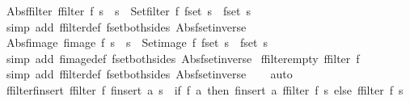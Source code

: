 \begin{isabellebody}
\endisatagproof
{\isafoldproof}%
%
\isadelimproof
\isanewline
%
\endisadelimproof
\isanewline
{}\isamarkupfalse%
\ Abs{\isacharunderscore}ffilter{\isacharcolon}\ {\isachardoublequoteopen}{\isacharparenleft}ffilter\ f\ s\ {\isacharequal}\ s{\isacharprime}{\isacharparenright}\ {\isacharequal}\ {\isacharparenleft}Set{\isachardot}filter\ f\ {\isacharparenleft}fset\ s{\isacharparenright}\ {\isacharequal}\ {\isacharparenleft}fset\ s{\isacharprime}{\isacharparenright}{\isacharparenright}{\isachardoublequoteclose}\isanewline
%
\isadelimproof
\ \ %
\endisadelimproof
%
\isatagproof
{}\isamarkupfalse%
\ {\isacharparenleft}simp\ add{\isacharcolon}\ ffilter{\isacharunderscore}def\ fset{\isacharunderscore}both{\isacharunderscore}sides\ Abs{\isacharunderscore}fset{\isacharunderscore}inverse{\isacharparenright}%
\endisatagproof
{\isafoldproof}%
%
\isadelimproof
\isanewline
%
\endisadelimproof
\isanewline
{}\isamarkupfalse%
\ Abs{\isacharunderscore}fimage{\isacharcolon}\ {\isachardoublequoteopen}{\isacharparenleft}fimage\ f\ s\ {\isacharequal}\ s{\isacharprime}{\isacharparenright}\ {\isacharequal}\ {\isacharparenleft}Set{\isachardot}image\ f\ {\isacharparenleft}fset\ s{\isacharparenright}\ {\isacharequal}\ {\isacharparenleft}fset\ s{\isacharprime}{\isacharparenright}{\isacharparenright}{\isachardoublequoteclose}\isanewline
%
\isadelimproof
\ \ %
\endisadelimproof
%
\isatagproof
{}\isamarkupfalse%
\ {\isacharparenleft}simp\ add{\isacharcolon}\ fimage{\isacharunderscore}def\ fset{\isacharunderscore}both{\isacharunderscore}sides\ Abs{\isacharunderscore}fset{\isacharunderscore}inverse{\isacharparenright}%
\endisatagproof
{\isafoldproof}%
%
\isadelimproof
\isanewline
%
\endisadelimproof
\isanewline
{}\isamarkupfalse%
\ ffilter{\isacharunderscore}empty{\isacharcolon}\ {\isachardoublequoteopen}ffilter\ f\ {\isacharbraceleft}{\isacharbar}{\isacharbar}{\isacharbraceright}\ {\isacharequal}\ {\isacharbraceleft}{\isacharbar}{\isacharbar}{\isacharbraceright}{\isachardoublequoteclose}\isanewline
%
\isadelimproof
\ \ %
\endisadelimproof
%
\isatagproof
{}\isamarkupfalse%
\ {\isacharparenleft}simp\ add{\isacharcolon}\ ffilter{\isacharunderscore}def\ fset{\isacharunderscore}both{\isacharunderscore}sides\ Abs{\isacharunderscore}fset{\isacharunderscore}inverse{\isacharparenright}\isanewline
\ \ \isamarkupfalse%
\ auto%
\endisatagproof
{\isafoldproof}%
%
\isadelimproof
\isanewline
%
\endisadelimproof
\isanewline
{}\isamarkupfalse%
\ ffilter{\isacharunderscore}finsert{\isacharcolon}\ {\isachardoublequoteopen}ffilter\ f\ {\isacharparenleft}finsert\ a\ s{\isacharparenright}\ {\isacharequal}\ {\isacharparenleft}if\ f\ a\ then\ finsert\ a\ {\isacharparenleft}ffilter\ f\ s{\isacharparenright}\ else\ {\isacharparenleft}ffilter\ f\ s{\isacharparenright}{\isacharparenright}{\isachardoublequoteclose}\isanewline

\end{isabellebody}
